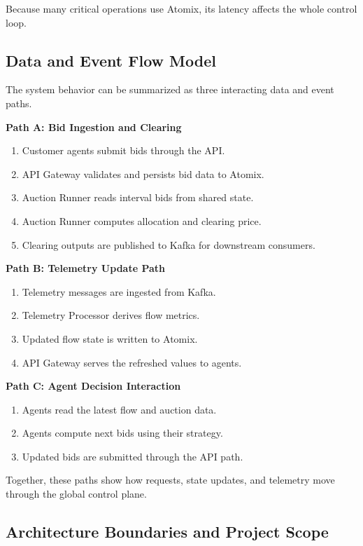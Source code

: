 Because many critical operations use Atomix, its latency affects the whole control loop.

\subsection{Data and Event Flow Model}

The system behavior can be summarized as three interacting data and event paths.

\textbf{Path A: Bid Ingestion and Clearing}

\begin{enumerate}
    \item Customer agents submit bids through the API.
    \item API Gateway validates and persists bid data to Atomix.
    \item Auction Runner reads interval bids from shared state.
    \item Auction Runner computes allocation and clearing price.
    \item Clearing outputs are published to Kafka for downstream consumers.
\end{enumerate}
\textbf{Path B: Telemetry Update Path}

\begin{enumerate}
    \item Telemetry messages are ingested from Kafka.
    \item Telemetry Processor derives flow metrics.
    \item Updated flow state is written to Atomix.
    \item API Gateway serves the refreshed values to agents.
\end{enumerate}

\textbf{Path C: Agent Decision Interaction}

\begin{enumerate}
    \item Agents read the latest flow and auction data.
    \item Agents compute next bids using their strategy.
    \item Updated bids are submitted through the API path.
\end{enumerate}

Together, these paths show how requests, state updates, and telemetry move through the global control plane.

\subsection{Architecture Boundaries and Project Scope}

